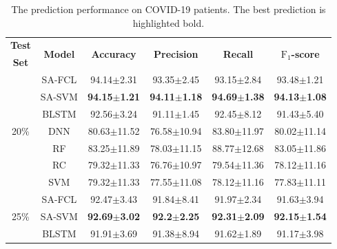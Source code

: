 \begin{table}[h]
    \centering
    \scriptsize
    \caption{The prediction performance on COVID-19 patients. The best prediction is highlighted bold.}\label{tab: experimetal results COVID}
    \begin{tabular}{c c cccc}
        \toprule
        {\bfseries Test} & \multirow{2}{*}{{\bfseries Model}} & \multirow{2}{*}{{\bfseries Accuracy}} & \multirow{2}{*}{{\bfseries Precision}} & \multirow{2}{*}{{\bfseries Recall}} & \multirow{2}{*}{{\bfseries $\text{F}_1$-score}}  \\ {\bfseries Set} & & & & & \\
        \midrule
    \multirow{7}{*}{20\%}  
    & SA-FCL & \multicolumn{1}{c}{94.14$\pm$2.31} & \multicolumn{1}{c}{93.35$\pm$2.45} & \multicolumn{1}{c}{93.15$\pm$2.84} & 93.48$\pm$1.21\\
    & SA-SVM & \multicolumn{1}{c}{{\bfseries 94.15$\pm$1.21}} & \multicolumn{1}{c}{\bfseries{94.11$\pm$1.18}} & \multicolumn{1}{c}{{\bfseries 94.69$\pm$1.38}} & {\bfseries 94.13$\pm$1.08}\\
    & BLSTM & \multicolumn{1}{c}{92.56$\pm$3.24} & \multicolumn{1}{c}{91.11$\pm$1.45} & \multicolumn{1}{c}{92.45$\pm$8.12} & 91.43$\pm$5.40\\
    & DNN & \multicolumn{1}{c}{80.63$\pm$11.52} & \multicolumn{1}{c}{76.58$\pm$10.94} & \multicolumn{1}{c}{83.80$\pm$11.97} & 80.02$\pm$11.14\\
    & RF & \multicolumn{1}{c}{83.25$\pm$11.89} & \multicolumn{1}{c}{78.03$\pm$11.15} & \multicolumn{1}{c}{88.77$\pm$12.68} & 83.05$\pm$11.86\\
    & RC & \multicolumn{1}{c}{79.32$\pm$11.33} & \multicolumn{1}{c}{76.76$\pm$10.97} & \multicolumn{1}{c}{79.54$\pm$11.36} & 78.12$\pm$11.16\\
    & SVM & \multicolumn{1}{c}{79.32$\pm$11.33} & \multicolumn{1}{c}{77.55$\pm$11.08} & \multicolumn{1}{c}{78.12$\pm$11.16} & 77.83$\pm$11.11\\
    \midrule
    \multirow{7}{*}{25\%}
    & SA-FCL & \multicolumn{1}{c}{92.47$\pm$3.43} & \multicolumn{1}{c}{91.84$\pm$8.41} & \multicolumn{1}{c}{91.97$\pm$2.34} & {91.63$\pm$3.94}\\
    & SA-SVM & \multicolumn{1}{c}{{\bfseries 92.69$\pm$3.02}} & \multicolumn{1}{c}{\bfseries{92.2$\pm$2.25}} & \multicolumn{1}{c}{{\bfseries 92.31$\pm$2.09}} & {\bfseries 92.15$\pm$1.54}\\
    & BLSTM & \multicolumn{1}{c}{91.91$\pm$3.69} & \multicolumn{1}{c}{91.38$\pm$8.94} & \multicolumn{1}{c}{91.62$\pm$1.89} & 91.17$\pm$3.98\\

\end{tabular}
\end{table}
